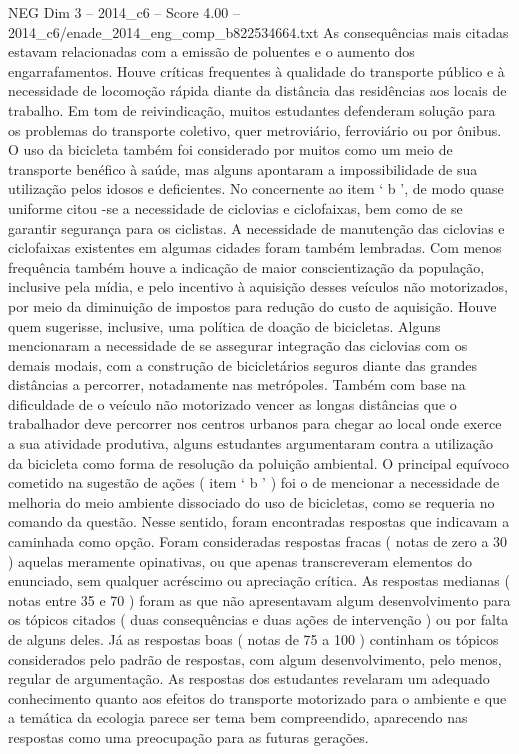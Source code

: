 \begin{textsample}{NEG Dim 3 – 2014\_c6 – Score 4.00 – 2014\_c6/enade\_2014\_eng\_comp\_b822534664.txt}
As consequências mais citadas estavam relacionadas com a emissão de poluentes e o aumento dos engarrafamentos.
Houve críticas frequentes à qualidade do transporte público e à necessidade de locomoção rápida diante da distância das residências aos locais de trabalho.
Em tom de reivindicação, muitos estudantes defenderam solução para os problemas do transporte coletivo, quer metroviário, ferroviário ou por ônibus.
O uso da bicicleta também foi considerado por muitos como um meio de transporte benéfico à saúde, mas alguns apontaram a impossibilidade de sua utilização pelos idosos e deficientes.
No concernente ao item ‘ b ’, de modo quase uniforme citou -se a necessidade de ciclovias e ciclofaixas, bem como de se garantir segurança para os ciclistas.
A necessidade de manutenção das ciclovias e ciclofaixas existentes em algumas cidades foram também lembradas.
Com menos frequência também houve a indicação de maior conscientização da população, inclusive pela mídia, e pelo incentivo à aquisição desses veículos não motorizados, por meio da diminuição de impostos para redução do custo de aquisição.
Houve quem sugerisse, inclusive, uma política de doação de bicicletas.
Alguns mencionaram a necessidade de se assegurar integração das ciclovias com os demais modais, com a construção de bicicletários seguros diante das grandes distâncias a percorrer, notadamente nas metrópoles.
Também com base na dificuldade de o veículo não motorizado vencer as longas distâncias que o trabalhador deve percorrer nos centros urbanos para chegar ao local onde exerce a sua atividade produtiva, alguns estudantes argumentaram contra a utilização da bicicleta como forma de resolução da poluição ambiental.
O principal equívoco cometido na sugestão de ações ( item ‘ b ’ ) foi o de mencionar a necessidade de melhoria do meio ambiente dissociado do uso de bicicletas, como se requeria no comando da questão.
Nesse sentido, foram encontradas respostas que indicavam a caminhada como opção.
Foram consideradas respostas fracas ( notas de zero a 30 ) aquelas meramente opinativas, ou que apenas transcreveram elementos do enunciado, sem qualquer acréscimo ou apreciação crítica.
As respostas medianas ( notas entre 35 e 70 ) foram as que não apresentavam algum desenvolvimento para os tópicos citados ( duas consequências e duas ações de intervenção ) ou por falta de alguns deles.
Já as respostas boas ( notas de 75 a 100 ) continham os tópicos considerados pelo padrão de respostas, com algum desenvolvimento, pelo menos, regular de argumentação.
As respostas dos estudantes revelaram um adequado conhecimento quanto aos efeitos do transporte motorizado para o ambiente e que a temática da ecologia parece ser tema bem compreendido, aparecendo nas respostas como uma preocupação para as futuras gerações.

\end{textsample}

